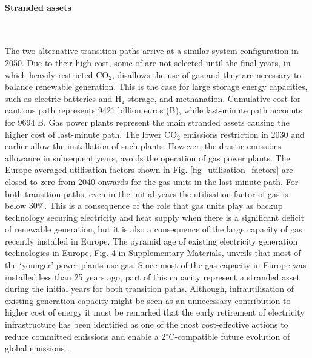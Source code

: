 \documentclass[5p]{elsarticle} %
\begin{document}
\paragraph{\textbf{Stranded assets}} \

The two alternative transition paths arrive at a similar system configuration in 2050. 
Due to their high cost, some of are not selected until the final years, in which heavily restricted CO$_2$, disallows the use of gas and they are necessary to balance renewable generation. This is the case for large storage energy capacities, such as electric batteries and H$_2$ storage, and methanation. Cumulative cost for cautious path represents 9421 billion euros (B\EUR), while last-minute path accounts for 9694 B\EUR. Gas power plants represent the main stranded assets causing the higher cost of last-minute path. The lower CO$_2$ emissions restriction in 2030 and earlier allow the installation of such plants. However, the drastic emissions allowance in subsequent years, avoids the operation of gas power plants. The Europe-averaged utilisation factors shown in Fig. \ref{fig_utilisation_factors} are closed to zero from 2040 onwards for the gas units in the last-minute path. For both transition paths, even in the initial years the utilisation factor of gas is below 30\%. This is a consequence of the role that gas units play as backup technology securing electricity and heat supply when there is a significant deficit of renewable generation, but it is also a consequence of the large capacity of gas recently installed in Europe. The pyramid age of existing electricity generation technologies in Europe, Fig. 4 in Supplementary Materials, unveils that most of the `younger' power plants use gas. Since most of the gas capacity in Europe was installed less than 25 years ago, part of this capacity represent a stranded asset during the initial years for both transition paths. Although, infrautilisation of existing generation capacity might be seen as an unnecessary contribution to higher cost of energy it must be remarked that the early retirement of electricity infrastructure has been identified as one of the most cost-effective actions to reduce committed emissions and enable a 2$^{\circ}$C-compatible future evolution of global emissions \cite{Tong_2019}.
\end{document}
